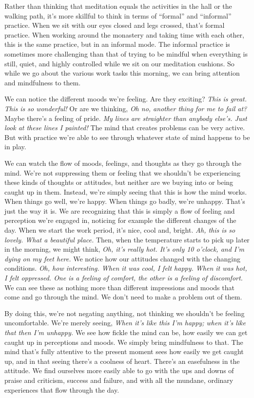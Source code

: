 Rather than thinking that meditation equals the activities in the hall 
or the walking path, it's more skillful to think in terms of ``formal'' 
and ``informal'' practice. When we sit with our eyes closed and legs 
crossed, that's formal practice. When working around the monastery and 
taking time with each other, this is the same practice, but in an 
informal mode. The informal practice is sometimes more challenging than 
that of trying to be mindful when everything is still, quiet, and 
highly controlled while we sit on our meditation cushions. So while we 
go about the various work tasks this morning, we can bring attention 
and mindfulness to them.

We can notice the different moods we're feeling. Are they exciting? 
\emph{This is great. This is so wonderful!} Or are we thinking, 
\emph{Oh no, another thing for me to fail at?} Maybe there's a feeling 
of pride. \emph{My lines are straighter than anybody else's. Just look 
at these lines I painted!} The mind that creates problems can be very 
active. But with practice we're able to see through whatever state of 
mind happens to be in play.

We can watch the flow of moods, feelings, and thoughts as they go 
through the mind. We're not suppressing them or feeling that we 
shouldn't be experiencing these kinds of thoughts or attitudes, but 
neither are we buying into or being caught up in them. Instead, we're 
simply seeing that this is how the mind works. When things go well, 
we're happy. When things go badly, we're unhappy. That's just the way 
it is. We are recognizing that this is simply a flow of feeling and 
perception we're engaged in, noticing for example the different changes 
of the day. When we start the work period, it's nice, cool and, bright. 
\emph{Ah, this is so lovely. What a beautiful place.} Then, when the 
temperature starts to pick up later in the morning, we might think, 
\emph{Oh, it's really hot. It's only 10 o'clock, and I'm dying on my 
feet here.} We notice how our attitudes changed with the changing 
conditions. \emph{Oh, how interesting. When it was cool, I felt happy. 
When it was hot, I felt oppressed. One is a feeling of comfort, the 
other is a feeling of discomfort.} We can see these as nothing more 
than different impressions and moods that come and go through the mind. 
We don't need to make a problem out of them.

By doing this, we're not negating anything, not thinking we shouldn't 
be feeling uncomfortable. We're merely seeing, \emph{When it's like 
this I'm happy; when it's like that then I'm unhappy.} We see how 
fickle the mind can be, how easily we can get caught up in perceptions 
and moods. We simply bring mindfulness to that. The mind that's fully 
attentive to the present moment sees how easily we get caught up, and 
in that seeing there's a coolness of heart. There's an easefulness in 
the attitude. We find ourselves more easily able to go with the ups and 
downs of praise and criticism, success and failure, and with all the 
mundane, ordinary experiences that flow through the day.

